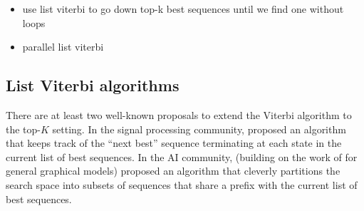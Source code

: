 
\begin{itemize}
    \item use list viterbi to go down top-k best sequences until we find one without loops
    \item parallel list viterbi
\end{itemize}

%
\subsection{List Viterbi algorithms}

There are at least two well-known proposals to extend the Viterbi algorithm to the top-$K$ setting.
In the signal processing community, \citet{seshadri1994list} proposed an algorithm that keeps track of the ``next best'' sequence terminating at each state in the current list of best sequences.
In the AI community, \citet{nilsson2001sequentially} (building on the work of \citet{Nilsson:1998} for general graphical models) proposed an algorithm that cleverly partitions the search space into subsets of sequences that share a prefix with the current list of best sequences.

